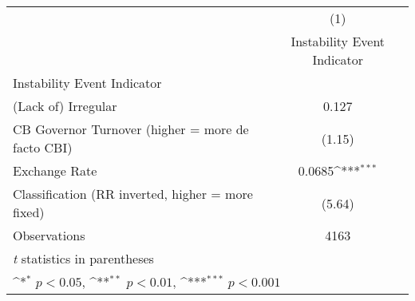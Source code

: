 {
\def\sym#1{\ifmmode^{#1}\else\(^{#1}\)\fi}
\begin{tabular}{l*{1}{c}}
\hline\hline
                    &\multicolumn{1}{c}{(1)}\\
                    &\multicolumn{1}{c}{Instability Event Indicator}\\
\hline
Instability Event Indicator&                     \\
(Lack of) Irregular &       0.127         \\
CB Governor Turnover (higher = more de facto CBI)&      (1.15)         \\
[1em]
Exchange Rate       &      0.0685\sym{***}\\
Classification (RR inverted, higher = more fixed)&      (5.64)         \\
\hline
Observations        &        4163         \\
\hline\hline
\multicolumn{2}{l}{\footnotesize \textit{t} statistics in parentheses}\\
\multicolumn{2}{l}{\footnotesize \sym{*} \(p<0.05\), \sym{**} \(p<0.01\), \sym{***} \(p<0.001\)}\\
\end{tabular}
}
